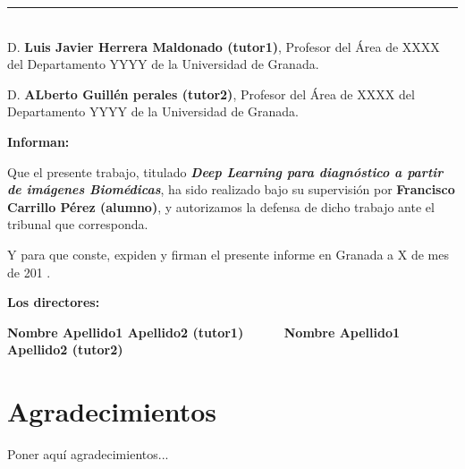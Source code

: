 \noindent\rule[-1ex]{\textwidth}{2pt}\\[4.5ex]

D. \textbf{Luis Javier Herrera Maldonado (tutor1)}, Profesor del Área de XXXX del Departamento YYYY de la Universidad de Granada.

\vspace{0.5cm}

D. \textbf{ALberto Guillén perales (tutor2)}, Profesor del Área de XXXX del Departamento YYYY de la Universidad de Granada.


\vspace{0.5cm}

\textbf{Informan:}

\vspace{0.5cm}

Que el presente trabajo, titulado \textit{\textbf{Deep Learning para diagnóstico a partir de imágenes Biomédicas}},
ha sido realizado bajo su supervisión por \textbf{Francisco Carrillo Pérez (alumno)}, y autorizamos la defensa de dicho trabajo ante el tribunal
que corresponda.

\vspace{0.5cm}

Y para que conste, expiden y firman el presente informe en Granada a X de mes de 201 .

\vspace{1cm}

\textbf{Los directores:}

\vspace{5cm}

\noindent \textbf{Nombre Apellido1 Apellido2 (tutor1) \ \ \ \ \ Nombre Apellido1 Apellido2 (tutor2)}

\chapter*{Agradecimientos}
\thispagestyle{empty}

       \vspace{1cm}


Poner aquí agradecimientos...

